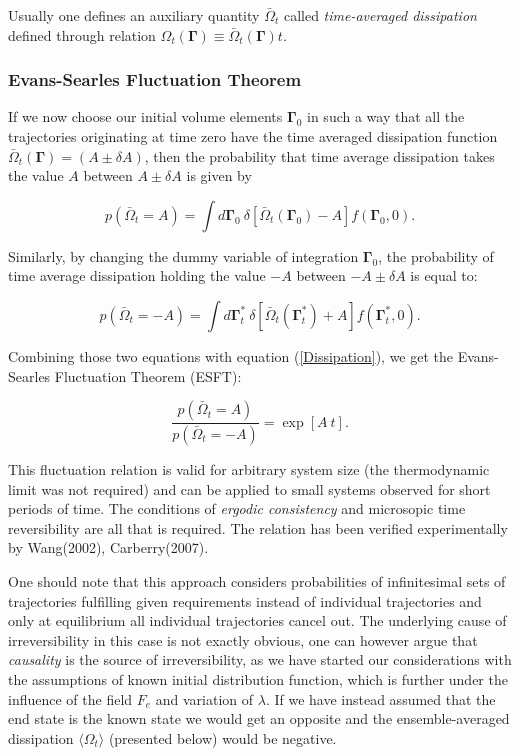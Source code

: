 \documentclass[a4paper,12pt]{article}
\begin{document}
Usually one defines an auxiliary quantity $\bar{\Omega}_t$ called \textit{time-averaged dissipation} defined through relation $\Omega_t(\bm{\Gamma}) \equiv \bar{\Omega}_t(\bm{\Gamma})t$.

\subsubsection{Evans-Searles Fluctuation Theorem}

If we now choose our initial volume elements $\bm{\Gamma}_0$ in such a way that all the trajectories originating at time zero have the time averaged dissipation function $\bar{\Omega}_t(\bm{\Gamma})=(A \pm \delta A)$, then the probability that time average dissipation takes the value $A$ between $A\pm \delta A$ is given by 

\begin{equation}
  p(\bar{\Omega}_t =A)=\int d\bm{\Gamma}_0\ \delta[\bar{\Omega}_t(\bm{\Gamma}_0)-A]f(\bm{\Gamma}_0,0).
\end{equation}

Similarly, by changing the dummy variable of integration $\bm{\Gamma}_0$, the probability of time average dissipation holding the value $-A$ between $-A\pm \delta A$ is equal to:

\begin{equation}
  p(\bar{\Omega}_t =-A)=\int d\bm{\Gamma}_t^*\ \delta[\bar{\Omega}_t(\bm{\Gamma}_t^*)+A]f(\bm{\Gamma}_t^*,0).
\end{equation}

Combining those two equations with equation (\ref{Dissipation}), we get the Evans-Searles Fluctuation Theorem (ESFT):

\begin{equation}
\label{ESFT}
  \frac{p(\bar{\Omega}_t=A)}{p(\bar{\Omega}_t=-A)}=\exp[A\ t].
\end{equation}

This fluctuation relation is valid for arbitrary system size (the thermodynamic limit was not required) and can be applied to small systems observed for short periods of time. The conditions of \textit{ergodic consistency} and microsopic time reversibility are all that is required.
The relation has been verified experimentally by Wang(2002)\cite{Wang:2002hw}, Carberry(2007)\cite{Carberry:2007be}.

One should note that this approach considers probabilities of infinitesimal sets of trajectories fulfilling given requirements instead of individual trajectories and only at equilibrium all individual trajectories cancel out.
The underlying cause of irreversibility in this case is not exactly obvious, one can however argue\cite{Evans:2241458} that \textit{causality} is the source of irreversibility, as we have started our considerations with the assumptions of known initial distribution function, which is further under the influence of the field $F_e$ and variation of $\lambda$. If we have instead assumed that the end state is the known state we would get an opposite and the ensemble-averaged dissipation $\langle \Omega_t \rangle$ (presented below) would be negative.
\end{document}
